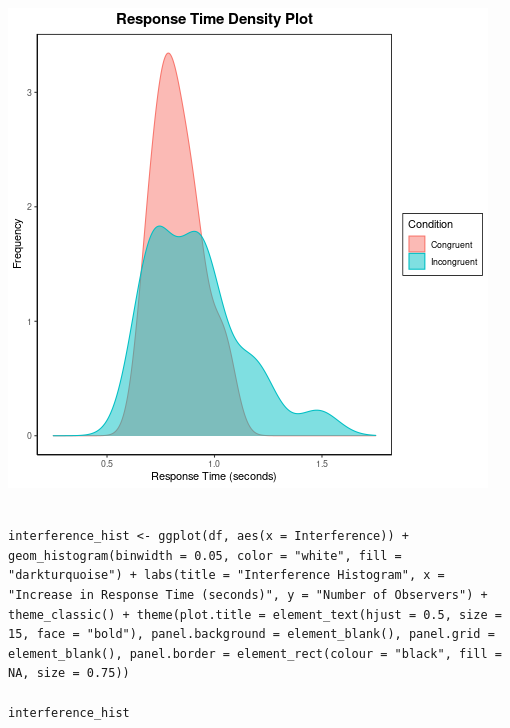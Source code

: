 \documentclass{article}
\begin{document}
\begin{center}
\includegraphics[width=.9\linewidth]{converted_stroop3.png}
\end{center}



\begin{verbatim}

interference_hist <- ggplot(df, aes(x = Interference)) + geom_histogram(binwidth = 0.05, color = "white", fill = "darkturquoise") + labs(title = "Interference Histogram", x = "Increase in Response Time (seconds)", y = "Number of Observers") + theme_classic() + theme(plot.title = element_text(hjust = 0.5, size = 15, face = "bold"), panel.background = element_blank(), panel.grid = element_blank(), panel.border = element_rect(colour = "black", fill = NA, size = 0.75))

interference_hist

\end{verbatim}
\end{document}
